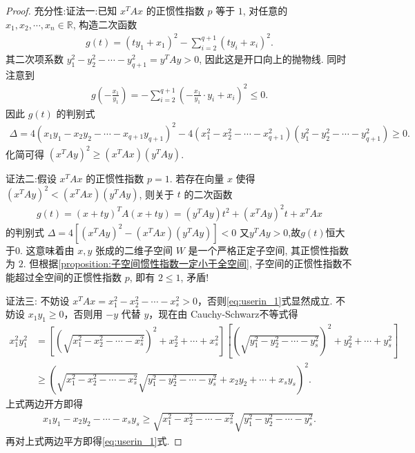 \documentclass[../../main.tex]{subfiles}%
\begin{document}
\begin{proof}
{\heiti 充分性:}{\color{blue}证法一:}已知 \(x^T A x\) 的正惯性指数 \(p\) 等于 \(1\), 对任意的 \(x_1, x_2, \cdots, x_n \in \mathbb{R}\), 构造二次函数
\begin{align*}
g(t) = (t y_1 + x_1)^2 - \sum_{i=2}^{q+1} (t y_i + x_i)^2.
\end{align*}
其二次项系数 \(y_1^2 - y_2^2 - \cdots - y_{q+1}^2 = y^T A y > 0\), 因此这是开口向上的抛物线. 同时注意到
\begin{align*}
g\left(-\frac{x_1}{y_1}\right) = -\sum_{i=2}^{q+1} \left(-\frac{x_1}{y_1} \cdot y_i + x_i\right)^2 \leqslant 0.
\end{align*}
因此 \(g(t)\) 的判别式
\begin{align*}
\Delta = 4(x_1 y_1 - x_2 y_2 - \cdots - x_{q+1} y_{q+1})^2 - 4(x_1^2 - x_2^2 - \cdots - x_{q+1}^2)(y_1^2 - y_2^2 - \cdots - y_{q+1}^2) \geqslant 0.
\end{align*}
化简可得 \((x^T A y)^2 \geqslant (x^T A x)(y^T A y)\).

{\color{blue}证法二:}假设 \(x^T A x\) 的正惯性指数 \(p = 1\). 若存在向量 \(x\) 使得 \((x^T A y)^2 < (x^T A x)(y^T A y)\), 则关于 \(t\) 的二次函数
\begin{align*}
g(t) = (x + t y)^T A (x + t y)=(y^TAy)t^2+(x^TAy)^2t+x^TAx
\end{align*}
的判别式
$\Delta = 4[(x^TAy)^2-(x^TAx)(y^TAy)]<0$
又\(y^T A y > 0\),故$g(t)$恒大于0.
这意味着由 \(x, y\) 张成的二维子空间 \(W\) 是一个严格正定子空间, 其正惯性指数为 \(2\). 但根据\cref{proposition:子空间惯性指数一定小于全空间}, 子空间的正惯性指数不能超过全空间的正惯性指数 \(p\), 即有 \(2 \leqslant 1\), 矛盾!

{\color{blue}证法三:}
不妨设 \(x^TAx=x_1^2 - x_2^2 - \cdots - x_s^2 > 0\)，否则\eqref{eq:userin_1}式显然成立. 不妨设 \(x_1 y_1 \geqslant 0\)，否则用 \(-y\) 代替 \(y\)，现在由 Cauchy-Schwarz不等式得
\begin{align*}
x_1^2 y_1^2 &= \left[ \left( \sqrt{x_1^2 - x_2^2 - \cdots - x_s^2} \right)^2 + x_2^2 + \cdots + x_s^2 \right] \left[ \left( \sqrt{y_1^2 - y_2^2 - \cdots - y_s^2} \right)^2 + y_2^2 + \cdots + y_s^2 \right] \\
&\geqslant \left( \sqrt{x_1^2 - x_2^2 - \cdots - x_s^2} \sqrt{y_1^2 - y_2^2 - \cdots - y_s^2} + x_2 y_2 + \cdots + x_s y_s \right)^2.
\end{align*}
上式两边开方即得
\begin{align*}
x_1 y_1 - x_2 y_2 - \cdots - x_s y_s \geqslant \sqrt{x_1^2 - x_2^2 - \cdots - x_s^2} \sqrt{y_1^2 - y_2^2 - \cdots - y_s^2}.
\end{align*}
再对上式两边平方即得\eqref{eq:userin_1}式.
\end{proof}
\end{document}
